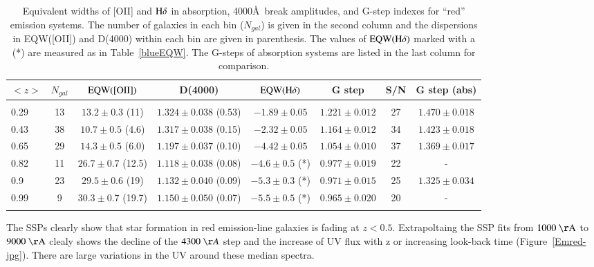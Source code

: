 \documentclass[referee]{aa}
\begin{document}
\begin{table}
\renewcommand{\arraystretch}{0.9}
\centering 
\caption{ Equivalent widths of [OII] and $\rm H\delta$ in absorption,
4000\AA\ break amplitudes, and  G-step indexes for  ``red'' emission systems.
 The number of galaxies in each bin ($N_{gal}$) is given in the second column
and the dispersions   in EQW([OII]) and  D(4000) within each bin are given in
parenthesis.
The values of $\rm EQW(H\delta)$ marked with a (*) are measured as in
Table~\ref{blueEQW}. 
 The G-steps of absorption systems are listed in the last column for comparison.\rm }

\begin{tabular}{ l c c c c c c c}
$<z>$ 	&   $N_{gal}$ & $\rm EQW([OII])$  &  D(4000)           & $\rm EQW(H\delta)$ &    G step                                & S/N  &   G step (abs)   \\ \hline
& & & & & & & \\
0.29  	&   13 	& $13.2 \pm 0.3$  (11)   	& $1.324 \pm 0.038$  (0.53)  & $-1.89 \pm 0.05$   & $1.221 \pm 0.012$          &  27   & $1.470 \pm 0.018$   \\
0.43         &  38  	& $10.7 \pm 0.5$  (4.6)   	& $1.317 \pm 0.038$  (0.15) & $-2.32 \pm 0.05$   & $1.164 \pm 0.012$   &  34   & $1.423 \pm 0.018$   \\
0.65         & 29 		& $14.3 \pm 0.5$  (6.0)  	& $1.197 \pm 0.037$  (0.10) & $-4.42 \pm 0.05$   & $1.054 \pm 0.010$   &  37   & $1.369 \pm 0.017$   \\
0.82  	&   11 	& $26.7 \pm 0.7$  (12.5)  	& $1.118 \pm 0.038$  (0.08) &  $-4.6 \pm 0.5$ (*)  & $0.977 \pm 0.019$         &  22   &        -            \\
0.9 	        &  23 	    & $29.5 \pm 0.6$  (19)   	& $1.132 \pm 0.040$  (0.09)  & $-5.3 \pm 0.3$ (*)  & $0.971 \pm 0.015$ &  25   & $1.325 \pm 0.034$   \\
0.99  	&   9 		&$30.3 \pm 0.7$  (19.7)   	& $1.150 \pm 0.050$  (0.07) &  $-5.5 \pm 0.5$ (*)  & $0.965 \pm 0.020$ &  20   &        -           \\

\hline \hline
\label{GD}
\end{tabular}
\end{table}

 The SSPs clearly 
show that star formation in red emission-line galaxies is fading at $z < 0.5$.
Extrapoltaing the SSP fits from $\rm 1000~\AA$ to $\rm 9000 ~\AA$ clealy shows the decline of the $4300~\AA$ step and the increase of
UV flux with z or increasing look-back time (Figure~\ref{Emred-jpg}). There are large variations in the UV around these median
spectra.
\end{document}
